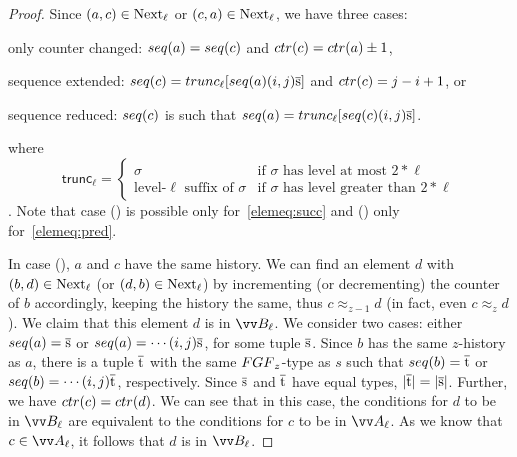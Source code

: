 \begin{proof}
  Since $(a,c) \in \mathrm{Next}_{\ell}$ or $(c,a) \in \mathrm{Next}_{\ell}$, we have three cases:
  \begin{romanenumerate}
    \item only counter changed: $\seq{a} = \seq{c}$ and $\ctr{c} = \ctr{a} \pm 1$,
    \item sequence extended: $\seq{c} = \mathsf{trunc}_{\ell}[\seq{a} (i,j) \elemtuples]$ and $\ctr{c} = j-i+1$, or
    \item sequence reduced: $\seq{c}$ is such that $\seq{a} = \mathsf{trunc}_{\ell}[\seq{c} (i,j) \elemtuples]$.
  \end{romanenumerate}
  where
  \begin{displaymath}
    \mathsf{trunc}_{\ell} =
    \begin{cases}
      \sigma & \text{if $\sigma$ has level at most $2 * \ell$} \\
      \text{level-$\ell$ suffix of $\sigma$} & \text{if $\sigma$ has level greater than $2 * \ell$}
    \end{cases}
  \end{displaymath}.
  Note that case () is possible only for~\ref{elemeq:succ} and () only for~\ref{elemeq:pred}.

  In case (), $a$ and $c$ have the same history.
  We can find an element $d$ with $(b,d) \in \mathrm{Next}_{\ell}$ (or $(d,b) \in \mathrm{Next}_{\ell}$) by incrementing (or decrementing) the counter of $b$ accordingly, keeping the history the same, thus $c \approx_{z-1} d$ (in fact, even $c \approx_{z} d$).
  We claim that this element $d$ is in $\unraveldom{B}_{\ell}$.
  We consider two cases: either $\seq{a} = \elemtuples$ or $\seq{a} = \cdots (i,j) \elemtuples$, for some tuple $\overline{\mathrm{s}}$.
  Since $b$ has the same $z$-history as $a$, there is a tuple $\overline{\mathrm{t}}$ with the same $\FGF_{z}$-type as $s$ such that $\seq{b} = \elemtuplet$ or $\seq{b} = \cdots (i,j) \elemtuplet$, respectively.
  Since $\overline{\mathrm{s}}$ and $\overline{\mathrm{t}}$ have equal types, $|\overline{\mathrm{t}}| = |\overline{\mathrm{s}}|$.
  Further, we have $\ctr{c} = \ctr{d}$.
  We can see that in this case, the conditions for $d$ to be in $\unraveldom{B}_{\ell}$ are equivalent to the conditions for $c$ to be in $\unraveldom{A}_{\ell}$.
  As we know that $c \in \unraveldom{A}_{\ell}$, it follows that $d$ is in $\unraveldom{B}_{\ell}$.


\end{proof}

